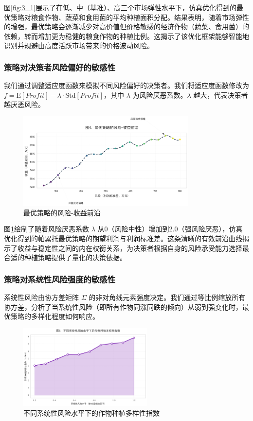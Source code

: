 \documentclass[withoutpreface,bwprint]{cumcmthesis} %
\begin{document}
图\ref{fig:3_1}展示了在低、中（基准）、高三个市场弹性水平下，仿真优化得到的最优策略对粮食作物、蔬菜和食用菌的平均种植面积分配。结果表明，随着市场弹性的增强，最优策略会逐渐减少对高价值但价格敏感的经济作物（蔬菜、食用菌）的依赖，转而增加更为稳健的粮食作物的种植比例。这揭示了该优化框架能够智能地识别并规避由高度活跃市场带来的价格波动风险。

\subsubsection{策略对决策者风险偏好的敏感性}

我们通过调整适应度函数来模拟不同风险偏好的决策者。我们将适应度函数修改为 $f = \text{E}[Profit] - \lambda \cdot \text{Std}[Profit]$，其中 $\lambda$ 为风险厌恶系数。$\lambda$ 越大，代表决策者越厌恶风险。

\begin{figure}[h]
    \centering
    \includegraphics[width=0.8\textwidth]{figures/3_2.png}
    \caption{最优策略的风险-收益前沿}
    \label{fig:3_2}
\end{figure}

图\ref{fig:3_2}绘制了随着风险厌恶系数 $\lambda$ 从0（风险中性）增加到2.0（强风险厌恶），仿真优化得到的帕累托最优策略的期望利润与利润标准差。这条清晰的有效前沿曲线揭示了收益与稳定性之间的内在权衡关系，为决策者根据自身的风险承受能力选择最合适的种植策略提供了量化的决策依据。

\subsubsection{策略对系统性风险强度的敏感性}

系统性风险由协方差矩阵 $\Sigma$ 的非对角线元素强度决定。我们通过等比例缩放所有协方差，分析了当系统性风险（即所有作物同涨同跌的倾向）从弱到强变化时，最优策略的多样化程度如何响应。

\begin{figure}[htbp]
    \centering
    \includegraphics[width=0.6\textwidth]{figures/3_3.png}
    \caption{不同系统性风险水平下的作物种植多样性指数}
    \label{fig:3_3}
\end{figure}
\end{document}
